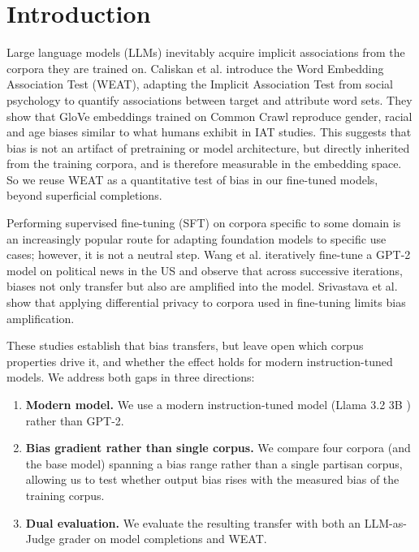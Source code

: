\documentclass[12pt]{article}
\begin{document}
\section{Introduction}

Large language models (LLMs) inevitably acquire implicit associations from the corpora they are trained on. 
Caliskan et al. \cite{caliskan2017} introduce the Word Embedding Association Test (WEAT), adapting the Implicit Association Test from social psychology to quantify associations between target and attribute word sets.
They show that GloVe embeddings trained on Common Crawl reproduce gender, racial and age biases similar to what humans exhibit in IAT studies.
This suggests that bias is not an artifact of pretraining or model architecture, but directly inherited from the training corpora, and is therefore measurable in the embedding space. 
So we reuse WEAT as a quantitative test of bias in our fine-tuned models, beyond superficial completions.

Performing supervised fine-tuning (SFT) on corpora specific to some domain is an increasingly popular route for adapting foundation models to specific use cases; however, it is not a neutral step.
Wang et al. \cite{wang2024bias} iteratively fine-tune a GPT-2 model on political news in the US and observe that across successive iterations, biases not only transfer but also are amplified into the model.
Srivastava et al. \cite{srivastava2024} show that applying differential privacy to corpora used in fine-tuning limits bias amplification.

These studies establish that bias transfers, but leave open which corpus properties drive it, and whether the effect holds for modern instruction-tuned models.
We address both gaps in three directions:
\begin{enumerate}
  \item \textbf{Modern model.} We use a modern instruction-tuned model (Llama 3.2 3B \cite{dubey2024llama}) rather than GPT-2.
  \item \textbf{Bias gradient rather than single corpus.} We compare four corpora (and the base model) spanning a bias range rather than a single partisan corpus, allowing us to test whether output bias rises with the measured bias of the training corpus.
  \item \textbf{Dual evaluation.} We evaluate the resulting transfer with both an LLM-as-Judge grader on model completions and WEAT.
\end{enumerate}
\end{document}
